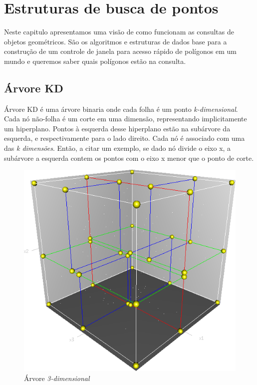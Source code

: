 \chapter{Estruturas de busca de pontos}\label{cap:desenvolvimento}
Neste capitulo apresentamos uma visão de como funcionam as consultas de objetos geométricos. 
São os algoritmos e estruturas de dados base para a construção de um controle de janela para acesso rápido de polígonos
em um mundo e queremos saber quais polígonos estão na consulta.

\section{Árvore KD}

Árvore KD é uma árvore binaria onde cada folha é um ponto \textit{k-dimensional}.
Cada nó não-folha é um corte em uma dimensão, representando implicitamente um hiperplano.
Pontos à esquerda desse hiperplano estão na subárvore da esquerda, e respectivamente para o lado direito.
Cada nó é associado com uma das \textit{k dimensões}. Então, a citar um exemplo, se dado nó divide o eixo
x, a subárvore a esquerda contem os pontos com o eixo x menor que o ponto de corte.

\begin{figure}[htb]
    \caption{\label{fig:Fig_1}Árvore \textit{3-dimensional}}
    \begin{center}
        \includegraphics[width=\linewidth/2]{./images/3dtree.png}
    \end{center}
\end{figure}

